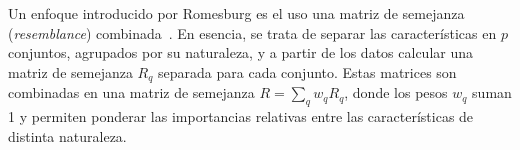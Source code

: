 \documentclass[spanish]{article}
\begin{document}
Un enfoque introducido por Romesburg es el uso una matriz de semejanza (\emph{resemblance})
combinada~\footnotemark.  En esencia, se trata de separar las características en $p$ conjuntos,
agrupados por su naturaleza, y a partir de los datos calcular una matriz de semejanza $R_q$ separada
para cada conjunto.
Estas matrices son combinadas en una matriz de semejanza $R = \sum_q w_q R_q$, donde los pesos $w_q$
suman 1 y permiten ponderar las importancias relativas entre las características de distinta
naturaleza.


%
%
\end{document}
